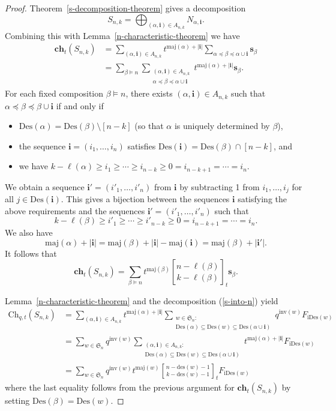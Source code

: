 \documentclass[ALCO,ThmDefs,published]{cedram}
\newcommand{\symm}{{\mathfrak{S}}}
\theoremstyle{plain}
\newcommand{\maj}{{\mathrm {maj}}}
\newcommand{\inv}{{\mathrm {inv}}}
\newcommand{\Des}{{\mathrm {Des}}}
\newcommand{\des}{{\mathrm {des}}}
\newcommand{\Ch}{{\mathrm {Ch}}}
\newcommand{\ch}{{\mathbf {ch}}}
\newcommand{\iDes}{{\mathrm {iDes}}}
\newcommand{\symm}{{\mathfrak{S}}}
\newcommand{\ii}{{\mathbf{i}}}
\newcommand{\sss}{{\mathbf{s}}}
\begin{document}
\begin{proof}
Theorem~\ref{s-decomposition-theorem} gives a decomposition 
\begin{equation}
\label{s-into-n}
S_{n,k} = \bigoplus_{(\alpha,\ii) \in A_{n,k}} N_{\alpha,\ii}.
\end{equation}
Combining this with Lemma~\ref{n-characteristic-theorem} we have
\begin{align*}
\ch_t(S_{n,k}) &= \sum_{(\alpha,\ii) \in A_{n,k}} t^{\maj(\alpha) + |\ii|} \sum_{\alpha \preceq \beta \preceq \alpha \cup \ii}
\sss_{\beta} \\
&= \sum_{\beta\models n} \sum_{ \substack{ (\alpha,\ii) \in A_{n,k} \\ \alpha \preceq \beta \preceq \alpha \cup \ii }}
 t^{\maj(\alpha) + |\ii|} \sss_{\beta}.
\end{align*}
For each fixed composition $\beta\models n$, there exists $(\alpha,\ii)\in A_{n,k}$ such that $\alpha\preceq \beta \preceq \beta\cup \ii$ if and only if 
\begin{itemize}
\item
$\Des(\alpha) = \Des(\beta)\setminus [n-k]$ (so that $\alpha$ is uniquely determined by $\beta$), 
\item
the sequence $\ii=(i_1,\ldots,i_n)$ satisfies $\Des(\ii) = \Des(\beta)\cap[n-k]$, and
\item we have
$k - \ell(\alpha) \geq i_1 \geq \cdots \geq i_{n-k} \geq 0 = i_{n-k+1} = \cdots = i_n$.
\end{itemize}
We obtain a sequence $\ii'=(i'_1,\ldots,i'_n)$ from $\ii$ by subtracting 1 from $i_1,\ldots,i_j$ for all $j\in\Des(\ii)$.
This gives a bijection between the sequences $\ii$ satisfying the above requirements and the sequences $\ii'=(i'_1,\ldots,i'_n)$ such that 
\[ k - \ell(\beta) \ge i'_1\ge\cdots\ge i'_{n-k} \ge 0 = i_{n-k+1} = \cdots = i_n.\]
We also have 
\[ \maj(\alpha)+|\ii| = \maj(\beta) +  |\ii|-\maj(\ii) = \maj(\beta) + |\ii'|.\]
It follows that 
\[ \ch_t(S_{n,k}) = \sum_{\beta\models n} t^{\maj(\beta)} {n - \ell(\beta) \brack k - \ell(\beta)}_t \sss_{\beta}. \]

Lemma~\ref{n-characteristic-theorem} and the decomposition (\ref{s-into-n}) yield
\begin{align*}
\Ch_{q,t}(S_{n,k}) &= \sum_{(\alpha,\ii) \in A_{n,k}} t^{\maj(\alpha) + |\ii|} 
\sum_{ \substack{ w\in\symm_n: \\ \Des(\alpha)\subseteq \Des(w) \subseteq \Des(\alpha\cup\ii) } } 
q^{\inv(w)} F_{\iDes(w)} \\
&= \sum_{w\in\symm_n} q^{\inv(w)} \sum_{ \substack{ (\alpha,\ii)\in A_{n,k}: \\ \Des(\alpha)\subseteq\Des(w) \subseteq \Des(\alpha\cup\ii) } } t^{\maj(\alpha) + |\ii|} F_{\iDes(w)} \\
&= \sum_{w\in\symm_n} q^{\inv(w)} t^{\maj(w)} {n - \des(w) - 1 \brack k - \des(w) - 1}_t F_{\iDes(w)}
\end{align*}
where the last equality follows from the previous argument for $\ch_t(S_{n,k})$ by setting $\Des(\beta) = \Des(w)$.


\end{proof}
\end{document}
